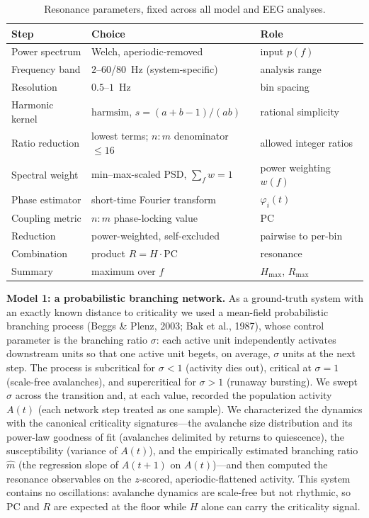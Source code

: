 \documentclass[11pt]{article}
\begin{document}
\begin{table}[t]\centering\small
\caption{Resonance parameters, fixed across all model and EEG analyses.}\label{tab:params}
\begin{tabular}{lll}\toprule
Step & Choice & Role \\ \midrule
Power spectrum & Welch, aperiodic-removed & input $p(f)$ \\
Frequency band & $2$--$60$/$80$~Hz (system-specific) & analysis range \\
Resolution & $0.5$--$1$~Hz & bin spacing \\
Harmonic kernel & $\mathrm{harmsim}$, $s=(a{+}b{-}1)/(ab)$ & rational simplicity \\
Ratio reduction & lowest terms; $n{:}m$ denominator $\le 16$ & allowed integer ratios \\
Spectral weight & min--max-scaled PSD, $\sum_f w=1$ & power weighting $w(f)$ \\
Phase estimator & short-time Fourier transform & $\varphi_i(t)$ \\
Coupling metric & $n{:}m$ phase-locking value & $\mathrm{PC}$ \\
Reduction & power-weighted, self-excluded & pairwise to per-bin \\
Combination & product $R=H\cdot\mathrm{PC}$ & resonance \\
Summary & maximum over $f$ & $H_{\max}$, $R_{\max}$ \\ \bottomrule
\end{tabular}\end{table}

\textbf{Model 1: a probabilistic branching network.} As a ground-truth system with an exactly known distance to criticality we used a mean-field probabilistic branching process (Beggs \& Plenz, 2003; Bak et al., 1987), whose control parameter is the branching ratio $\sigma$: each active unit independently activates downstream units so that one active unit begets, on average, $\sigma$ units at the next step. The process is subcritical for $\sigma<1$ (activity dies out), critical at $\sigma=1$ (scale-free avalanches), and supercritical for $\sigma>1$ (runaway bursting). We swept $\sigma$ across the transition and, at each value, recorded the population activity $A(t)$ (each network step treated as one sample). We characterized the dynamics with the canonical criticality signatures---the avalanche size distribution and its power-law goodness of fit (avalanches delimited by returns to quiescence), the susceptibility (variance of $A(t)$), and the empirically estimated branching ratio $\hat m$ (the regression slope of $A(t{+}1)$ on $A(t)$)---and then computed the resonance observables on the $z$-scored, aperiodic-flattened activity. This system contains no oscillations: avalanche dynamics are scale-free but not rhythmic, so $\mathrm{PC}$ and $R$ are expected at the floor while $H$ alone can carry the criticality signal.
\end{document}
